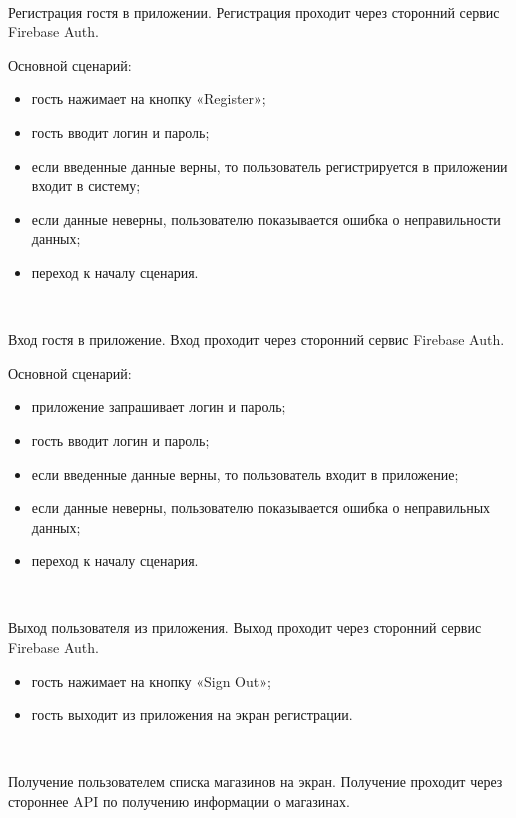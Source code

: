 ~\par

Регистрация гостя в приложении. Регистрация проходит через сторонний сервис Firebase Auth.

Основной сценарий:

\begin{itemize}
  \item гость нажимает на кнопку «Register»;
  \item гость вводит логин и пароль;
  \item если введенные данные верны, то пользователь регистрируется в приложении входит в систему;
  \item если данные неверны, пользователю показывается ошибка о неправильности данных;
  \item переход к началу сценария.
\end{itemize}

~\par

Вход гостя в приложение. Вход проходит через сторонний сервис Firebase Auth.

Основной сценарий:

\begin{itemize}
  \item приложение запрашивает логин и пароль;
  \item гость вводит логин и пароль;
  \item если введенные данные верны, то пользователь входит в приложение;
  \item если данные неверны, пользователю показывается ошибка о неправильных данных;
  \item переход к началу сценария.
\end{itemize}

~\par

Выход пользователя из приложения. Выход проходит через сторонний сервис Firebase Auth.

\begin{itemize}
  \item гость нажимает на кнопку «Sign Out»;
  \item гость выходит из приложения на экран регистрации.
\end{itemize}

~\par

Получение пользователем списка магазинов на экран. Получение проходит через стороннее API по получению информации о магазинах.

